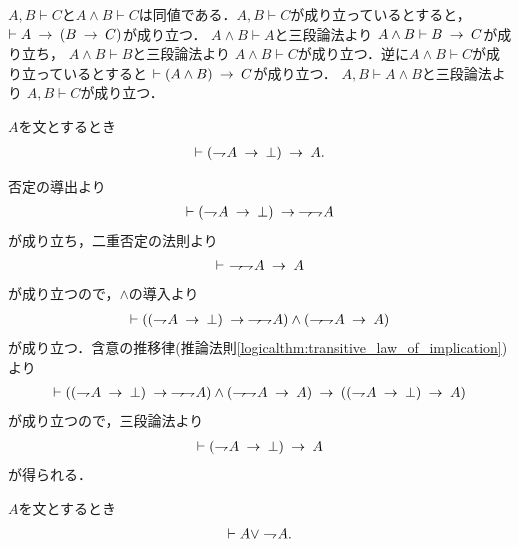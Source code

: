 	$A,B \vdash C$と$A \wedge B \vdash C$は同値である．$A,B \vdash C$が成り立っているとすると，
	$\vdash A \rarrow (B \rarrow C)$が成り立つ．
	$A \wedge B \vdash A$と三段論法より
	$A \wedge B \vdash B \rarrow C$が成り立ち，
	$A \wedge B \vdash B$と三段論法より
	$A \wedge B \vdash C$が成り立つ．逆に$A \wedge B \vdash C$が成り立っているとすると
	$\vdash (A \wedge B) \rarrow C$が成り立つ．
	$A,B \vdash A \wedge B$と三段論法より
	$A, B \vdash C$が成り立つ．
	
	\begin{screen}
		\begin{logicalthm}[背理法の原理]
			$A$を文とするとき
			\begin{align}
				\vdash (\negation A \rarrow \bot) \rarrow A.
			\end{align}
		\end{logicalthm}
	\end{screen}
	
	\begin{prf}
		否定の導出より
		\begin{align}
			\vdash (\negation A \rarrow \bot) \rarrow \negation \negation A
		\end{align}
		が成り立ち，二重否定の法則より
		\begin{align}
			\vdash\ \negation \negation A \rarrow A
		\end{align}
		が成り立つので，$\wedge$の導入より
		\begin{align}
			\vdash ((\negation A \rarrow \bot) \rarrow \negation \negation A)
			\wedge (\negation \negation A \rarrow A)
		\end{align}
		が成り立つ．含意の推移律(推論法則\ref{logicalthm:transitive_law_of_implication})より
		\begin{align}
			\vdash ((\negation A \rarrow \bot) \rarrow \negation \negation A)
			\wedge (\negation \negation A \rarrow A)
			\rarrow ((\negation A \rarrow \bot) \rarrow A)
		\end{align}
		が成り立つので，三段論法より
		\begin{align}
			\vdash (\negation A \rarrow \bot) \rarrow A
		\end{align}
		が得られる．
		\QED
	\end{prf}
	
	\begin{screen}
		\begin{logicalthm}[排中律]\label{logicalthm:law_of_excluded_middle}
			$A$を文とするとき
			\begin{align}
				\vdash A \vee \negation A.
			\end{align}
		\end{logicalthm}
	\end{screen}
	
